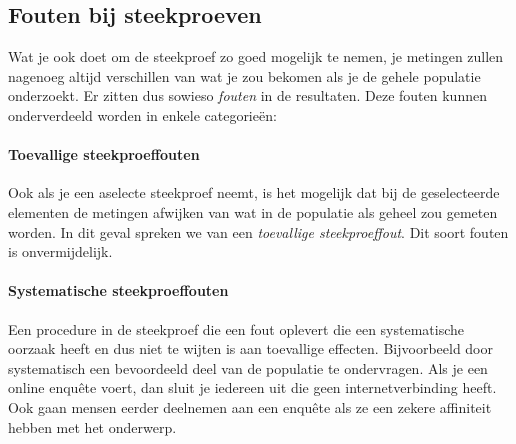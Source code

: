 

\subsection{Fouten bij steekproeven}

Wat je ook doet om de steekproef zo goed mogelijk te nemen, je metingen zullen nagenoeg altijd verschillen van wat je zou bekomen als je de gehele populatie onderzoekt. Er zitten dus sowieso \emph{fouten} in de resultaten. Deze fouten kunnen onderverdeeld worden in enkele categorieën:

\paragraph{Toevallige steekproeffouten}

Ook als je een aselecte steekproef neemt, is het mogelijk dat bij de geselecteerde elementen de metingen afwijken van wat in de populatie als geheel zou gemeten worden. In dit geval spreken we van een \emph{toevallige steekproeffout}. Dit soort fouten is onvermijdelijk.

\paragraph{Systematische steekproeffouten}

Een procedure in de steekproef die een fout oplevert die een systematische oorzaak heeft en dus niet te wijten is aan toevallige effecten. Bijvoorbeeld door systematisch een bevoordeeld deel van de populatie te ondervragen. Als je een online enquête voert, dan sluit je iedereen uit die geen internetverbinding heeft. Ook gaan mensen eerder deelnemen aan een enquête als ze een zekere affiniteit hebben met het onderwerp.

